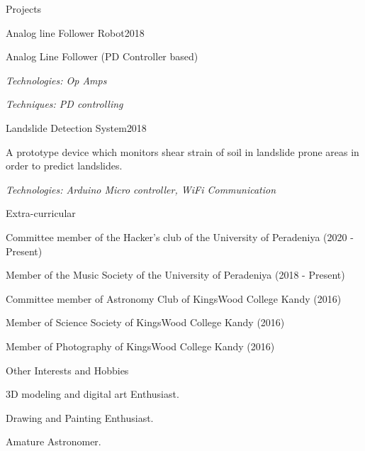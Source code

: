 \documentclass{resume} %
\newcommand{\itab}[1]{\hspace{0em}\rlap{#1}}
\begin{document}
\begin{rSection}{Projects}
\begin{rSubsection}{Analog line Follower Robot}{2018}{}{}
\item Analog Line Follower (PD Controller based)
\item \textit{Technologies: Op Amps}
\item \textit{Techniques: PD controlling}
\end{rSubsection}

\begin{rSubsection}{Landslide Detection System}{2018}{}{}
\item A prototype device which monitors shear strain of soil in landslide prone areas in order to predict landslides.
\item \textit{Technologies: Arduino Micro controller, WiFi Communication}
\end{rSubsection}





\end{rSection}

\begin{rSection}{Extra-curricular} \itemsep -3pt
\item Committee member of the Hacker's club of the University of Peradeniya (2020 - Present)
\item Member of the Music Society of the University of Peradeniya (2018 - Present)
\item Committee member of Astronomy Club of KingsWood College Kandy (2016)
\item Member of Science Society of KingsWood College Kandy (2016)
\item Member of Photography of KingsWood College Kandy (2016)

 
\end{rSection}


\begin{rSection}{Other Interests and Hobbies} \itemsep -3pt
\item 3D modeling and digital art Enthusiast.
\item Drawing and Painting Enthusiast.
\item Amature Astronomer.


\end{rSection}



\end{document}

